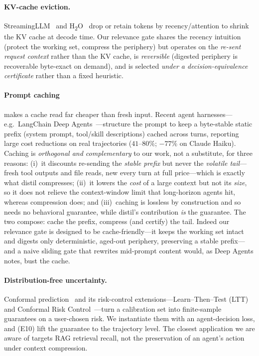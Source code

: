 \documentclass[11pt]{article}
\begin{document}
\paragraph{KV-cache eviction.} StreamingLLM~\cite{streamingllm} and
H\textsubscript{2}O~\cite{h2o} drop or retain tokens by recency/attention to shrink the
KV cache at decode time. Our relevance gate shares the recency intuition (protect the
working set, compress the periphery) but operates on the \emph{re-sent request context}
rather than the KV cache, is \emph{reversible} (digested periphery is recoverable
byte-exact on demand), and is selected \emph{under a decision-equivalence certificate}
rather than a fixed heuristic.
\paragraph{Prompt caching} makes a cache read far cheaper than fresh input. Recent agent
harnesses---e.g.\ LangChain Deep Agents~\cite{deepagents}---structure the prompt to keep a
byte-stable static prefix (system prompt, tool/skill descriptions) cached across turns,
reporting large cost reductions on real trajectories ($41$--$80\%$; $-77\%$ on Claude Haiku).
Caching is \emph{orthogonal and complementary} to our work, not a substitute, for three
reasons: (i)~it discounts re-sending the \emph{stable prefix} but never the \emph{volatile
tail}---fresh tool outputs and file reads, new every turn at full price---which is exactly
what distil compresses; (ii)~it lowers the \emph{cost} of a large context but not its
\emph{size}, so it does not relieve the context-window limit that long-horizon agents hit,
whereas compression does; and (iii)~caching is lossless by construction and so needs no
behavioral guarantee, while distil's contribution \emph{is} the guarantee. The two compose:
cache the prefix, compress (and certify) the tail. Indeed our relevance gate is designed to
be cache-friendly---it keeps the working set intact and digests only deterministic, aged-out
periphery, preserving a stable prefix---and a naive sliding gate that rewrites mid-prompt
content would, as Deep Agents notes, bust the cache.
\paragraph{Distribution-free uncertainty.} Conformal prediction~\cite{vovk} and its
risk-control extensions---Learn--Then--Test (LTT)~\cite{ltt} and Conformal Risk
Control~\cite{crc}---turn a calibration set into finite-sample guarantees on a
user-chosen risk. We instantiate them with an agent-decision loss, and (E10) lift the
guarantee to the trajectory level. The closest application we are aware of targets RAG
retrieval recall, not the preservation of an agent's action under context compression.
\end{document}
